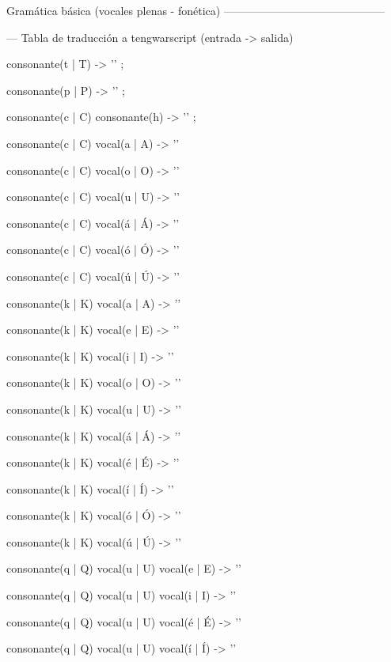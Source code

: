 \documentclass{minimal}
\begin{document}
    
    Gramática básica (vocales plenas - fonética)
    --------------------------------------------
    
    --- Tabla de traducción a tengwarscript (entrada -> salida)
    
    consonante(t | T) -> '\Ttinco' ;
    
    consonante(p | P) -> '\Tparma' ;
    
    consonante(c | C) consonante(h) -> '\Tcalma' ;
    
    consonante(c | C) vocal(a | A) -> '\Tquesse\Tvilya'
    
    consonante(c | C) vocal(o | O) -> '\Tquesse\Tanna'
    
    consonante(c | C) vocal(u | U) -> '\Tquesse\Tvala'
    
    consonante(c | C) vocal(á | Á) -> '\Tquesse\Tvilya\TTthreedots'
    
    consonante(c | C) vocal(ó | Ó) -> '\Tquesse\Tanna\TTrightcurl'
    
    consonante(c | C) vocal(ú | Ú) -> '\Tquesse\Tvala\TTleftcurl'
    
    consonante(k | K) vocal(a | A) -> '\Tquesse\Tvilya'
    
    consonante(k | K) vocal(e | E) -> '\Tquesse\Tyanta'
    
    consonante(k | K) vocal(i | I) -> '\Tquesse\Ttelco'
    
    consonante(k | K) vocal(o | O) -> '\Tquesse\Tanna'
    
    consonante(k | K) vocal(u | U) -> '\Tquesse\Tvala'
    
    consonante(k | K) vocal(á | Á) -> '\Tquesse\Tvilya\TTdoubler'
    
    consonante(k | K) vocal(é | É) -> '\Tquesse\Tyanta\TTdoubler'
    
    consonante(k | K) vocal(í | Í) -> '\Tquesse\Ttelco\TTdoubler'
    
    consonante(k | K) vocal(ó | Ó) -> '\Tquesse\Tanna\TTdoubler'
    
    consonante(k | K) vocal(ú | Ú) -> '\Tquesse\Tvala\TTdoubler'
    
    consonante(q | Q) vocal(u | U) vocal(e | E) -> '\Tquesse\Tyanta'
    
    consonante(q | Q) vocal(u | U) vocal(i | I) -> '\Tquesse\Ttelco'
    
    consonante(q | Q) vocal(u | U) vocal(é | É) -> '\Tquesse\Tyanta\TTdoubler'
    
    consonante(q | Q) vocal(u | U) vocal(í | Í) -> '\Tquesse\Ttelco\TTdoubler'
    
\end{document}
